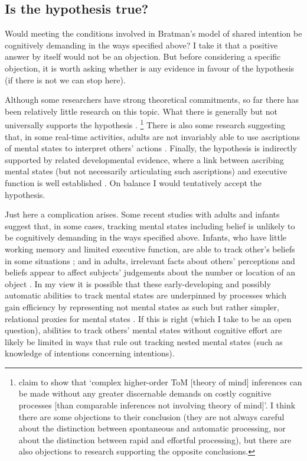 \documentclass[12pt,letterpaper]{extarticle}
\begin{document}
\subsection{Is the hypothesis true?}
Would meeting the conditions involved in Bratman's model of shared intention be cognitively demanding in the ways specified above?
I take it that a positive answer by itself would not be an objection.
But before considering a specific objection, it is worth asking whether is any evidence in favour of the hypothesis (if there is not we can stop here).

Although some researchers have strong theoretical commitments, so far there has been relatively little research on this topic.
What there is generally but not universally supports the hypothesis \citep[e.g.][]{McKinnon:2007rr,Apperly:2008jv}.%
%
\footnote{
\citet[][p.\ 193]{ferguson_eye_2011} claim to show that `complex higher-order ToM [theory of mind] inferences can be made without any greater discernable demands on costly cognitive processes [than comparable inferences not involving theory of mind]'.
I think there are some objections to their conclusion (they are not always careful about the distinction between spontaneous and automatic processing, nor about the distinction between rapid and effortful processing), but there are also objections to research supporting the opposite conclusions.
}
%
There is also some research suggesting that, in some real-time activities, adults are not invariably able to use ascriptions of mental states to interpret others' actions \citep{Keysar:2003xu,apperly_why_2010}.
Finally, the hypothesis is indirectly supported by related developmental evidence, where a link between ascribing mental states (but not necessarily articulating such ascriptions) and executive function is well established \citep{Perner:1999yr}.
On balance I would tentatively accept the hypothesis.

Just here a complication arises.
Some recent studies with adults and infants suggest that, in some cases, tracking mental states including belief is unlikely to be cognitively demanding in the ways specified above.
Infants, who have little working memory and limited executive function, are able to track other's beliefs in some situations \citep{Onishi:2005hm,Baillargeon:gx,Southgate:2007js};
and in adults, irrelevant facts about others' perceptions and beliefs appear to affect subjects' judgements about the number or location of an object \citep{Samson:2010jm,kovacs_social_2010}.
In my view it is possible that these early-developing and possibly automatic abilities to track mental states are underpinned by processes which gain efficiency by representing not mental states as such but rather  simpler, relational proxies for mental states \citep{Apperly:2009ju,butterfill_minimal,surtees_direct_2011}.
If this is right (which I take to be an open question), abilities to track others' mental states without cognitive effort are likely be limited in ways that rule out tracking nested mental states (such as knowledge of intentions concerning intentions).
\end{document}
